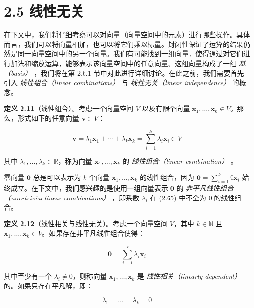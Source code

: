 \section*{2.5 线性无关}
\label{sec:2.5}

在下文中，我们将仔细考察可以对向量（向量空间中的元素）进行哪些操作。具体而言，我们可以将向量相加，也可以将它们乘以标量。封闭性保证了运算的结果仍然是同一向量空间中的另一个向量。我们有可能找到一组向量，使得通过对它们进行加法和缩放运算，能够表示该向量空间中的任意向量。这组向量构成了一组 \emph{基（basis）} ，我们将在第 2.6.1 节中对此进行详细讨论。在此之前，我们需要首先引入 \emph{线性组合（linear combinations）} 与 \emph{线性无关（linear independence）} 的概念。

\textbf{定义 2.11}（线性组合）。考虑一个向量空间 $ V $ 以及有限个向量 $ \boldsymbol{x}_1, \ldots, \boldsymbol{x}_k \in V $。那么，形式如下的任意向量 $ \boldsymbol{v} \in V $：

\begin{equation}
\boldsymbol{v} = \lambda_1 \boldsymbol{x}_1 + \cdots + \lambda_k \boldsymbol{x}_k = \sum_{i=1}^k \lambda_i \boldsymbol{x}_i \in V
\tag{2.65}\label{eq:2-65}
\end{equation}

其中 $ \lambda_1, \ldots, \lambda_k \in \mathbb{R} $，称为向量 $ \boldsymbol{x}_1, \ldots, \boldsymbol{x}_k $ 的 \emph{线性组合（linear combination）} 。

零向量 $ \boldsymbol{0} $ 总是可以表示为 $ k $ 个向量 $ \boldsymbol{x}_1, \ldots, \boldsymbol{x}_k $ 的线性组合，因为 $ \boldsymbol{0} = \sum_{i=1}^k 0 \boldsymbol{x}_i $ 始终成立。在下文中，我们感兴趣的是使用一组向量表示 $ \boldsymbol{0} $ 的 \emph{非平凡线性组合（non-trivial linear combinations）} ，即系数 $ \lambda_i $ 在 (2.65) 中不全为 0 的线性组合。

\textbf{定义 2.12}（线性相关与线性无关）。考虑一个向量空间 $ V $，其中 $ k \in \mathbb{N} $ 且 $ \boldsymbol{x}_1, \ldots, \boldsymbol{x}_k \in V $。如果存在非平凡线性组合使得：

\begin{equation*}
\boldsymbol{0} = \sum_{i=1}^k \lambda_i \boldsymbol{x}_i
\end{equation*}

其中至少有一个 $ \lambda_i \neq 0 $，则称向量 $ \boldsymbol{x}_1, \ldots, \boldsymbol{x}_k $ 是 \emph{线性相关（linearly dependent）} 的。如果只存在平凡解，即：

\begin{equation*}
\lambda_1 = \ldots = \lambda_k = 0
\end{equation*}

